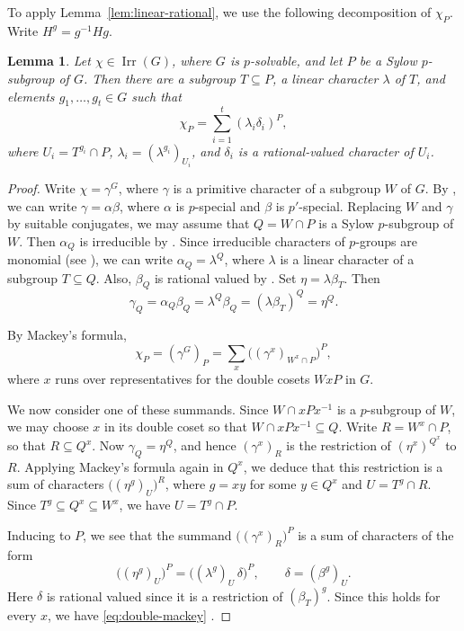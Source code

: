 \documentclass[reqno]{amsart}
\newtheorem{lem}[thm]{Lemma}
\theoremstyle{definition}
\theoremstyle{remark}
\numberwithin{equation}{section}
\DeclareMathOperator{\Irr}{Irr}
\theoremstyle{plain}
\begin{document}
To apply Lemma~\ref{lem:linear-rational}, we use the following
decomposition of $\chi_P$.
Write $H^g=g^{-1}Hg$.

\begin{lem}\label{lem:sylow-decomposition}
Let $\chi\in\Irr(G)$, where $G$ is $p$-solvable, and let
$P$ be a Sylow $p$-subgroup of $G$.
Then there are a subgroup $T\subseteq P$, a linear character
$\lambda$ of $T$, and elements $g_1,\ldots,g_t\in G$ such that
\begin{equation}\label{eq:double-mackey}
  \chi_P=\sum_{i=1}^t(\lambda_i\delta_i)^P,
\end{equation}
where $U_i=T^{g_i}\cap P$,
$\lambda_i=(\lambda^{g_i})_{U_i}$, and $\delta_i$ is a
rational-valued character of $U_i$.
\end{lem}

\begin{proof}
Write $\chi=\gamma^G$, where $\gamma$ is a primitive character of a
subgroup $W$ of $G$. By \cite[Theorem~2.9]{I2018}, we can write
$\gamma=\alpha\beta$, where $\alpha$ is $p$-special and $\beta$ is
$p'$-special. Replacing $W$ and $\gamma$ by suitable conjugates,
we may assume that $Q=W\cap P$ is a Sylow $p$-subgroup of $W$.
Then $\alpha_Q$ is irreducible by \cite[Theorem~2.10]{I2018}.
Since irreducible characters of $p$-groups are monomial
(see \cite[Corollary~6.14]{I1976}), we can write
$\alpha_Q=\lambda^Q$, where $\lambda$ is a linear character of a
subgroup $T\subseteq Q$. Also, $\beta_Q$ is rational valued by
\cite[Corollary~2.14]{I2018}. Set $\eta=\lambda\beta_T$. Then
\[
  \gamma_Q=\alpha_Q\beta_Q=\lambda^Q\beta_Q
          =(\lambda\beta_T)^Q=\eta^Q.
\]

By Mackey's formula,
\[
  \chi_P=(\gamma^G)_P
        =\sum_x\bigl((\gamma^x)_{W^x\cap P}\bigr)^P,
\]
where $x$ runs over representatives for the double cosets $WxP$ in $G$.

We now consider one of these summands. Since $W\cap xPx^{-1}$
is a $p$-subgroup of $W$, we may choose $x$ in its double coset so that
$W\cap xPx^{-1}\subseteq Q$. Write $R=W^x\cap P$, so that
$R\subseteq Q^x$. Now $\gamma_Q=\eta^Q$, and hence $(\gamma^x)_R$
is the restriction of $(\eta^x)^{Q^x}$ to $R$. Applying Mackey's
formula again in $Q^x$, we deduce that this restriction is a sum of
characters
$\bigl((\eta^g)_U\bigr)^R$, where $g=xy$ for some $y\in Q^x$ and
$U=T^g\cap R$. Since $T^g\subseteq Q^x\subseteq W^x$, we have
$U=T^g\cap P$.

Inducing to $P$, we see that the summand
$\bigl((\gamma^x)_R\bigr)^P$ is a sum of characters of the form
\[
  \bigl((\eta^g)_U\bigr)^P
  =\bigl((\lambda^g)_U\,\delta\bigr)^P,
  \qquad \delta=(\beta^g)_U.
\]
Here $\delta$ is rational valued since it is a restriction of
$(\beta_T)^g$. Since this holds for every $x$, we have \eqref{eq:double-mackey} .
\end{proof}
\end{document}
